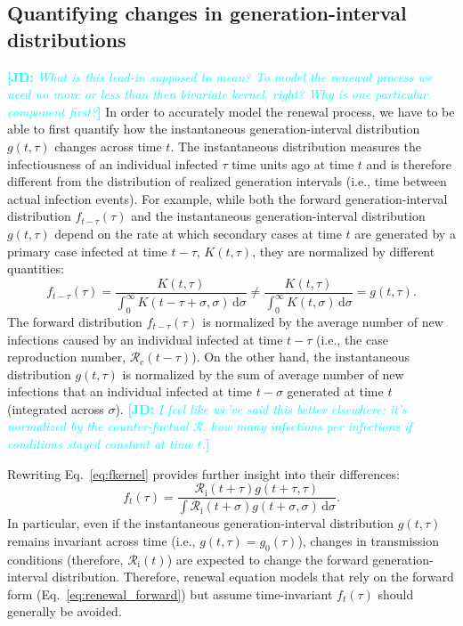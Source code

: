 \documentclass[12pt]{article}
\newcommand{\comment}{\showcomment}
\newcommand{\showcomment}[3]{\textcolor{#1}{\textbf{[#2: }\textsl{#3}\textbf{]}}}
\newcommand{\jd}[1]{\comment{cyan}{JD}{#1}}
\newcommand{\eref}[1]{Eq.~\ref{eq:#1}}
\newcommand{\Rx}[1]{\ensuremath{{\mathcal R}_{#1}}\xspace}
\newcommand{\Rc}{\Rx{\mathrm{c}}}
\newcommand{\Ri}{\Rx{\mathrm{i}}}
\newcommand{\dd}[1]{\ensuremath{\, \mathrm{d}#1}}
\newcommand{\dsigma}{\dd{\sigma}}
\begin{document}
\subsection{Quantifying changes in generation-interval distributions}
\label{ss:instg}

\jd{What is this lead-in supposed to mean? To model the renewal process we need no more or less than then bivariate kernel, right? Why is one particular component first?} In order to accurately model the renewal process, we have to be able to first quantify how the instantaneous generation-interval distribution $g(t, \tau)$ changes across time $t$.
The instantaneous distribution measures the infectiousness of an individual infected $\tau$ time units ago at time $t$ and is therefore different from the distribution of realized generation intervals (i.e., time between actual infection events).
For example, while both the forward generation-interval distribution $f_{t-\tau}(\tau)$ and the instantaneous generation-interval distribution $g(t, \tau)$ depend on the rate at which secondary cases at time $t$ are generated by a primary case infected at time $t-\tau$, $K(t, \tau)$, they are normalized by different quantities:
\begin{equation}
f_{t-\tau}(\tau) = \frac{K(t,\tau)}{\int_0^\infty K(t-\tau+\sigma,\sigma) \dsigma} \neq \frac{K(t,\tau)}{\int_0^\infty K(t,\sigma) \dsigma} = g(t, \tau).
\end{equation}
The forward distribution $f_{t-\tau}(\tau)$ is normalized by the average number of new infections caused by an individual infected at time $t-\tau$ (i.e., the case reproduction number, $\Rc(t-\tau)$).
On the other hand, the instantaneous distribution $g(t, \tau)$ is normalized by the sum of average number of new infections that an individual infected at time $t-\sigma$ generated at time $t$ (integrated across $\sigma$).
\jd{I feel like we've said this better elsewhere: it's normalized by the counter-factual \Rx: how many infections per infections if conditions stayed constant at time $t$.}

Rewriting \eref{fkernel} provides further insight into their differences:
\begin{equation}
f_t(\tau) = \frac{\Ri(t + \tau) g(t+\tau, \tau)}{\int \Ri(t + \sigma) g(t+\sigma, \sigma) \dsigma}.
\end{equation}
In particular, even if the instantaneous generation-interval distribution $g(t, \tau)$ remains invariant across time (i.e., $g(t, \tau) = g_0(\tau)$), changes in transmission conditions (therefore, $\Ri(t)$) are expected to change the forward generation-interval distribution.
Therefore, renewal equation models that rely on the forward form (\eref{renewal_forward}) but assume time-invariant $f_t(\tau)$ should generally be avoided.
\end{document}

